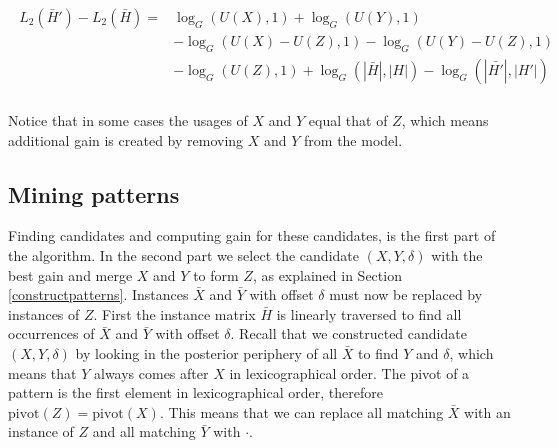 \documentclass{llncs}
\begin{document}
\begin{align}
\begin{split}
	L_2(\bar{H}') - L_2(\bar{H}) = &\log_G(U(X),1) + \log_G(U(Y),1) \\
			      &- \log_G(U(X)-U(Z),1) - \log_G(U(Y)-U(Z),1) \\
			      &- \log_G(U(Z),1) + \log_G(|\bar{H}|,|H|) - \log_G(|\bar{H'}|,|H'|) \\
\end{split}   
\end{align}

\noindent Notice that in some cases the usages of $X$ and $Y$ equal that of $Z$, which means additional gain is created by removing $X$ and $Y$ from the model. 

\subsection{Mining patterns}

Finding candidates and computing gain for these candidates, is the first part of the algorithm. In the second part we select the candidate $(X,Y,\delta)$ with the best gain and merge $X$ and $Y$ to form $Z$, as explained in Section \ref{constructpatterns}. Instances $\bar{X}$ and $\bar{Y}$ with offset $\delta$ must now be replaced by instances of $Z$. First the instance matrix $\bar{H}$ is linearly traversed to find all occurrences of $\bar{X}$ and $\bar{Y}$ with offset $\delta$. Recall that we constructed candidate $(X,Y,\delta)$ by looking in the posterior periphery of all $\bar{X}$ to find $Y$ and $\delta$, which means that $Y$ always comes after $X$ in lexicographical order. The pivot of a pattern is the first element in lexicographical order, therefore $\mathrm{pivot}(Z) = \mathrm{pivot}(X)$. This means that we can replace all matching $\bar{X}$ with an instance of $Z$ and all matching $\bar{Y}$ with $\cdot$. 
\end{document}
